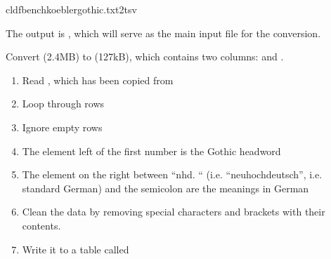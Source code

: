 \documentclass[letterpaper,10pt,english]{sphinxmanual}
\begin{document}
\begin{sphinxVerbatim}[commandchars=\\\{\}]
cldfbenchkoeblergothic.txt2tsv
\end{sphinxVerbatim}

\sphinxAtStartPar
The output is , which will serve as the main input file
for the conversion.

\label{\detokenize{mkcldf:module-koeblergothiccommands.txt2tsv}}
\sphinxAtStartPar
Convert  (2.4MB) to  (127kB), which
contains two columns:  and .

\begin{fulllineitems}
\label{\detokenize{mkcldf:koeblergothiccommands.txt2tsv.run}}
\pysigstartsignatures
{}
\pysigstopsignatures\begin{enumerate}
%
\item {} 
\sphinxAtStartPar
Read , which has been copied from

\item {} 
\sphinxAtStartPar
Loop through rows

\item {} 
\sphinxAtStartPar
Ignore empty rows

\item {} 
\sphinxAtStartPar
The element left of the first number is the Gothic headword

\item {} 
\sphinxAtStartPar
The element on the right between “nhd. “ (i.e. “neuhochdeutsch”, i.e.
standard German) and the semi\sphinxhyphen{}colon are the meanings in German

\item {} 
\sphinxAtStartPar
Clean the data by removing special characters and brackets with their
contents.

\item {} 
\sphinxAtStartPar
Write it to a table called 

\end{enumerate}

\end{fulllineitems}
\end{document}

